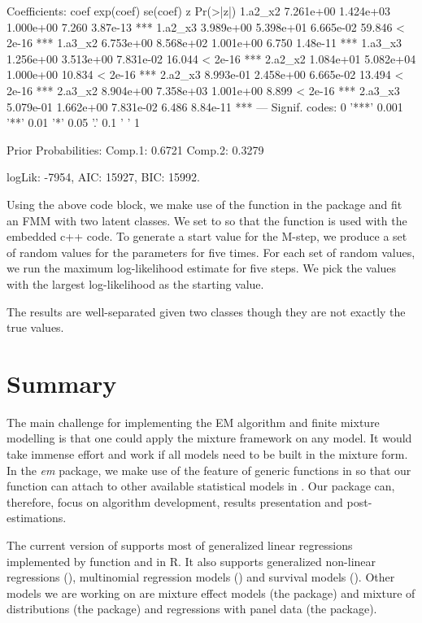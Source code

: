 \documentclass[nojss]{jss}
\begin{document}
\begin{Schunk}
\begin{Soutput}
Coefficients: 
             coef exp(coef)  se(coef)      z Pr(>|z|)    
1.a2_x2 7.261e+00 1.424e+03 1.000e+00  7.260 3.87e-13 ***
1.a2_x3 3.989e+00 5.398e+01 6.665e-02 59.846  < 2e-16 ***
1.a3_x2 6.753e+00 8.568e+02 1.001e+00  6.750 1.48e-11 ***
1.a3_x3 1.256e+00 3.513e+00 7.831e-02 16.044  < 2e-16 ***
2.a2_x2 1.084e+01 5.082e+04 1.000e+00 10.834  < 2e-16 ***
2.a2_x3 8.993e-01 2.458e+00 6.665e-02 13.494  < 2e-16 ***
2.a3_x2 8.904e+00 7.358e+03 1.001e+00  8.899  < 2e-16 ***
2.a3_x3 5.079e-01 1.662e+00 7.831e-02  6.486 8.84e-11 ***
---
Signif. codes:  0 '***' 0.001 '**' 0.01 '*' 0.05 '.' 0.1 ' ' 1

Prior Probabilities: 
Comp.1: 0.6721
Comp.2: 0.3279


logLik: -7954, AIC: 15927, BIC: 15992. 
\end{Soutput}
\end{Schunk}

Using the above code block, we make use of the function  in the  package and fit an FMM with two latent classes. We set  to  so that the  function is used with the embedded c++ code. To generate a start value for the M-step, we produce a set of random values for the parameters for five times. For each set of random values, we run the maximum log-likelihood estimate for five steps. We pick the values with the largest log-likelihood as the starting value.

The results are well-separated given two classes though they are not exactly the true values. 
   \section{Summary}
   The main challenge for implementing the EM algorithm and finite mixture modelling is that one could apply the mixture framework on any model. It would take immense effort and work if all models need to be built in the mixture form. In the \emph{em} package, we make use of the feature of generic functions in  so that our  function can attach to other available statistical models in . Our package can, therefore, focus on algorithm development, results presentation and post-estimations.
   
   The current version of  supports most of generalized linear regressions implemented by function  and  in R. It also supports generalized non-linear regressions (), multinomial regression models () and survival models (). Other models we are working on are mixture effect models (the  package) and mixture of distributions (the  package) and regressions with panel data (the  package).
   
\end{document}
